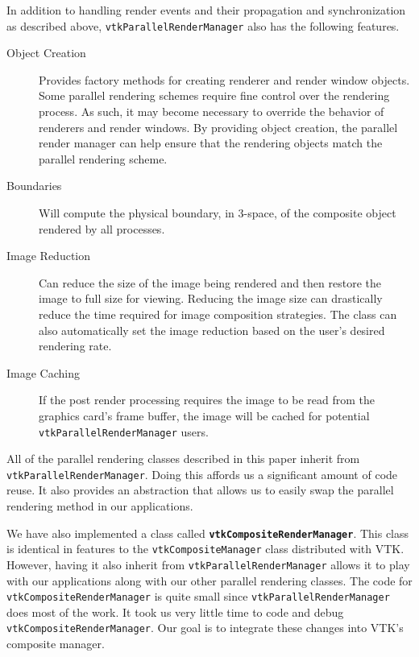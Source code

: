 \documentclass{acmsiggraph}
\newcommand{\cidentifier}[1]{\texttt{#1}}
\newcommand{\keyterm}[1]{\textbf{#1}}
\begin{document}
  In addition to handling render events and their propagation and
  synchronization as described above,
  \cidentifier{vtk\-Parallel\-Render\-Manager} also has the following
  features.
  \begin{description}
    \item [Object Creation] Provides factory methods for creating renderer
      and render window objects.  Some parallel rendering schemes require
      fine control over the rendering process.  As such, it may become
      necessary to override the behavior of renderers and render windows.
      By providing object creation, the parallel render manager can help
      ensure that the rendering objects match the parallel rendering
      scheme.
    \item [Boundaries] Will compute the physical boundary, in 3-space, of
      the composite object rendered by all processes.
    \item [Image Reduction] Can reduce the size of the image being rendered
      and then restore the image to full size for viewing.  Reducing the
      image size can drastically reduce the time required for image
      composition strategies.  The class can also automatically set the
      image reduction based on the user's desired rendering rate.
    \item [Image Caching] If the post render processing requires the image
      to be read from the graphics card's frame buffer, the image will be
      cached for potential \cidentifier{vtk\-Parallel\-Render\-Manager}
      users.
  \end{description}

  All of the parallel rendering classes described in this paper inherit
  from \cidentifier{vtk\-Parallel\-Render\-Manager}.  Doing this affords us
  a significant amount of code reuse.  It also provides an abstraction that
  allows us to easily swap the parallel rendering method in our
  applications.

  We have also implemented a class called
  \keyterm{\cidentifier{vtk\-Composite\-Render\-Manager}}.  This class is
  identical in features to the \cidentifier{vtk\-Composite\-Manager} class
  distributed with VTK.  However, having it also inherit from
  \cidentifier{vtk\-Parallel\-Render\-Manager} allows it to play with our
  applications along with our other parallel rendering classes.  The code
  for \cidentifier{vtk\-Composite\-Render\-Manager} is quite small since
  \cidentifier{vtk\-Parallel\-Render\-Manager} does most of the work.  It
  took us very little time to code and debug
  \cidentifier{vtk\-Composite\-Render\-Manager}.  Our goal is to integrate
  these changes into VTK's composite manager.
\end{document}
